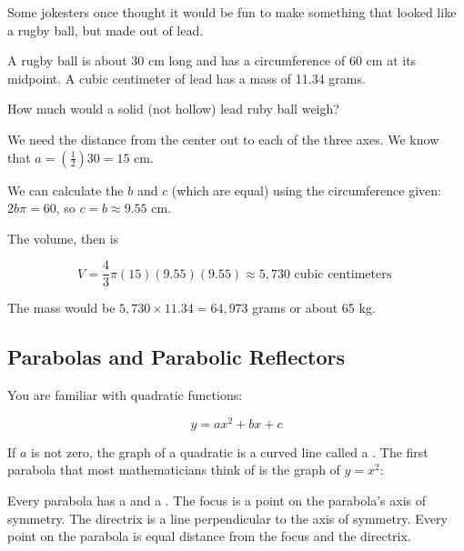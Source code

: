 \begin{Exercise}[title={Volume of Ruby Ball}, label=rugby_ball]

  Some jokesters once thought it would be fun to make something that looked like a rugby ball, but made out of lead.

  A rugby ball is about 30 cm long and has a circumference of 60 cm at
  its midpoint. A cubic centimeter of lead has a mass of 11.34 grams.

  How much would a solid (not hollow) lead ruby ball weigh?

\end{Exercise}
\begin{Answer}[ref=rugby_ball]

  We need the distance from the center out to each of the three axes. We know that $a = \left(\frac{1}{2} \right) 30 = 15$ cm.

  We can calculate the $b$ and $c$ (which are equal) using the circumference given: $2b\pi = 60$, so $c = b \approx 9.55$ cm.

  The volume, then is
  
  $$V = \frac{4}{3} \pi (15)(9.55)(9.55) \approx 5,730 \text{ cubic centimeters }$$ 

  The mass would be $5,730 \times 11.34 = 64,973$ grams or about 65 kg.
\end{Answer}
  
\subsection{Parabolas and Parabolic Reflectors}

You are familiar with quadratic functions:

$$y = a x^2 + b x + c$$

If $a$ is not zero, the graph of a quadratic is a curved line called a
. The first parabola that most mathematicians think of is the graph of $y = x^2$:

Every parabola has a  and a . The
focus is a point on the parabola's axis of symmetry. The directrix is
a line perpendicular to the axis of symmetry. Every point on the
parabola is equal distance from the focus and the directrix.

